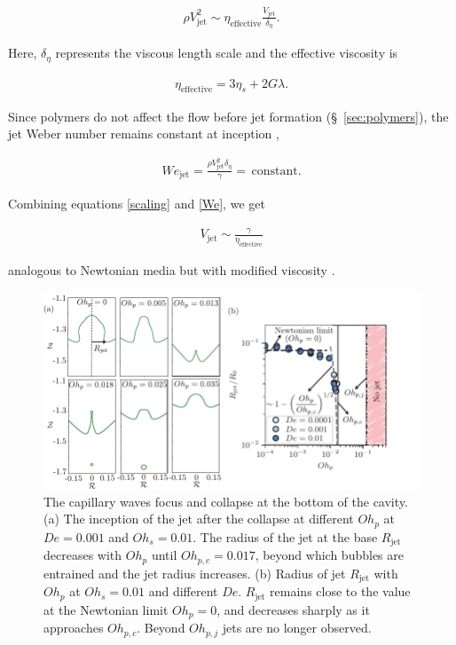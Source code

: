 \documentclass{jfm}
\newcommand{\oo}{\color{black} \normalfont}
\newcommand{\bb}{\color{black} \normalfont}
\begin{document}
\begin{align}
	\rho V_{\text{jet}}^2 \sim \eta_{\text{effective}}\frac{V_{\text{jet}}}{\delta_\eta}.
	\label{scaling}
\end{align}

\noindent Here, $\delta_\eta$ represents the viscous length scale and the effective viscosity is

\begin{align}
	\label{eqn:etaEff}
  \eta_{\text{effective}} = 3\eta_s + 2G\lambda .
\end{align}

\noindent \oo Since polymers do not affect the flow before jet formation (\S~\ref{sec:polymers}), the jet Weber number remains constant at inception \citep{blanco2021jets},\bb

\begin{align}
	We_{\text{jet}} = \frac{\rho V_{\text{jet}}^2 \delta_\eta}{\gamma} =\,\text{constant}.
	\label{We}
\end{align}

\noindent Combining equations \eqref{scaling} and \eqref{We}, we get

\begin{align}
	V_{\text{jet}}  \sim \frac{\gamma}{\eta_{\text{effective}}}
	\label{velocityscale}
\end{align}

\noindent \oo analogous to Newtonian media but with modified viscosity \citep{gordillo2019capillary, blanco2020sea}.\bb


\begin{figure}
	\centering
	\includegraphics[width=\textwidth]{Rjet_Ohp_05-eps-converted-to.pdf}
	\caption{
		The capillary waves focus and collapse at the bottom of the cavity. (a) The inception of the jet after the collapse at different $Oh_p$ at $De = 0.001$ and $Oh_s = 0.01$. The radius of the jet at the base $R_{\text{jet}}$ decreases with $Oh_p$ until $Oh_{p,c} = 0.017$, beyond which bubbles are entrained and the jet radius increases.
		(b) Radius of jet $R_{\text{jet}}$ with $Oh_p$ at  $Oh_s = 0.01$ and different $De$. $R_{\text{jet}}$ remains close to the value at the Newtonian limit $Oh_p = 0$, and decreases sharply as it approaches $Oh_{p,c}$. Beyond $Oh_{p,j}$ jets are no longer observed.
	}
	\label{Rjet_Ohp}
\end{figure}
\end{document}
